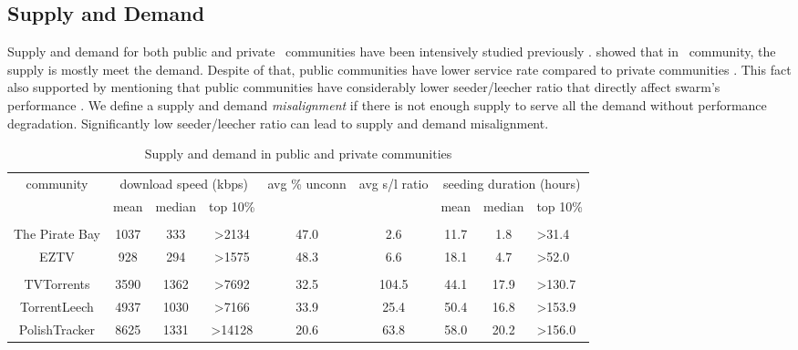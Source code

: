 \subsection{Supply and Demand}
\label{section:suppdemand}
Supply and demand for both public and private \bt~communities have been intensively studied previously \cite{2009:demandsupplyres:andrade, 2010:pubpriv:meulpolder}. \citeauthor{2009:demandsupplyres:andrade} showed that in \bt~community, the supply is mostly meet the demand. Despite of that, public communities have lower service rate compared to private communities \cite{2009:demandsupplyres:andrade}. This fact also supported by \citeauthor{2010:pubpriv:meulpolder} mentioning that public communities have considerably lower seeder/leecher ratio that directly affect swarm's performance \cite{2010:pubpriv:meulpolder}. We define a supply and demand \textit{misalignment} if there is not enough supply to serve all the demand without performance degradation. Significantly low seeder/leecher ratio can lead to supply and demand misalignment.

\begin{table}[]
	\centering
	\caption{Supply and demand in public and private communities \cite{2010:pubpriv:meulpolder}}
	\label{tbl:supdemand}
	\begin{adjustwidth}{-1.5cm}{}
	\begin{tabular}{|c|c|c|c|c|c|c|c|l|}
		\hline
		\multicolumn{1}{|c|}{\multirow{2}{0.1\linewidth}{community}} &  \multicolumn{3}{c|}{download speed (kbps)} & \multicolumn{1}{c|}{\multirow{2}{0.1\linewidth}{avg \% unconn}} & \multicolumn{1}{c|}{\multirow{2}{0.1\linewidth}{avg s/l ratio}} & \multicolumn{3}{c|}{seeding duration (hours)} \\ \cline{2-4} \cline{7-9} 
		\multicolumn{1}{|c|}{} & {mean} & {median} & {top 10\%} & {} & {} & {mean} & {median} & {top 10\%} \\ \hline
		\multicolumn{8}{l}{} \\ \hline
		The Pirate Bay & {1037} & {333} & {\textgreater2134} & {47.0} & {2.6} & {11.7} & {1.8} & {\textgreater31.4} \\ \hline
		EZTV  & {928} & {294} & {\textgreater1575} & {48.3} & {6.6} & {18.1} & {4.7} & {\textgreater52.0} \\ \hline
		\multicolumn{8}{l}{} \\ \hline
		TVTorrents & 3590 & 1362 & \textgreater7692 & 32.5 & 104.5 & 44.1 & 17.9 & \textgreater130.7 \\ \hline
		TorrentLeech  & {4937} & {1030} & {\textgreater7166} & {33.9} & {25.4} & {50.4} & {16.8} & {\textgreater153.9} \\ \hline
		PolishTracker  & {8625} & {1331} & {\textgreater14128} & {20.6} & {63.8} & {58.0} & {20.2} & {\textgreater156.0} \\ \hline
	\end{tabular}
		\end{adjustwidth}
\end{table}

